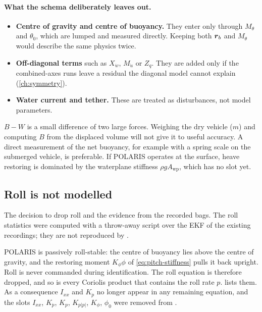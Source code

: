 \paragraph{What the schema deliberately leaves out.}
\begin{itemize}
  \item \textbf{Centre of gravity and centre of buoyancy.} They enter only through
        $M_\theta$ and $\theta_0$, which are lumped and measured directly.
        Keeping both $\boldsymbol{r}_b$ and $M_\theta$ would describe the same physics twice.
  \item \textbf{Off-diagonal terms} such as $X_{\dot w}$, $M_{\dot u}$ or $Z_q$. They are added
        only if the combined-axes runs leave a residual the diagonal model cannot explain
        (\cref{ch:symmetry}).
  \item \textbf{Water current and tether.} These are treated as disturbances, not model
        parameters.
\end{itemize}

\begin{caution}
$B - W$ is a small difference of two large forces. Weighing the dry vehicle ($m$) and computing
$B$ from the displaced volume will not give it to useful accuracy. A direct measurement of the
net buoyancy, for example with a spring scale on the submerged vehicle, is preferable. If
POLARIS operates at the surface, heave restoring is dominated by the waterplane stiffness
$\rho g A_\mathrm{wp}$, which has no slot yet.
\end{caution}

\subsection{Roll is not modelled}
\label{sec:no-roll}

\begin{revised}[title={New subsection, added 15 October 2026}]
The decision to drop roll and the evidence from the recorded bags. The roll statistics were
computed with a throw-away script over the EKF of the existing recordings; they are not
reproduced by .
\end{revised}

POLARIS is passively roll-stable: the centre of buoyancy lies above the centre of gravity,
and the restoring moment $K_\phi\phi$ of \eqref{eq:pitch-stiffness} pulls it back upright.
Roll is never commanded during identification. The roll equation is therefore dropped, and so
is every Coriolis product that contains the roll rate $p$.  lists them.
As a consequence $I_{xx}$ and $K_{\dot p}$ no longer appear in any remaining equation, and
the slots $I_{xx}$, $K_{\dot p}$, $K_p$, $K_{p|p|}$, $K_\phi$, $\phi_0$ were removed from
.

